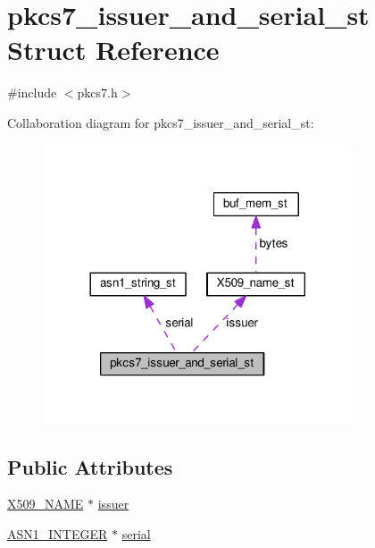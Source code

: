 \hypertarget{structpkcs7__issuer__and__serial__st}{}\section{pkcs7\+\_\+issuer\+\_\+and\+\_\+serial\+\_\+st Struct Reference}
\label{structpkcs7__issuer__and__serial__st}


{\ttfamily \#include $<$pkcs7.\+h$>$}



Collaboration diagram for pkcs7\+\_\+issuer\+\_\+and\+\_\+serial\+\_\+st\+:
\nopagebreak
\begin{figure}[H]
\begin{center}
\leavevmode
\includegraphics[width=260pt]{structpkcs7__issuer__and__serial__st__coll__graph}
\end{center}
\end{figure}
\subsection*{Public Attributes}
\begin{DoxyCompactItemize}
\item 
\hyperlink{ossl__typ_8h_a5c5fc036757e87b9bd163d0221696533}{X509\+\_\+\+N\+A\+ME} $\ast$ \hyperlink{structpkcs7__issuer__and__serial__st_ace9f7a526b2d91328ce37a1b3d26c179}{issuer}
\item 
\hyperlink{ossl__typ_8h_af4335399bf9774cb410a5e93de65998b}{A\+S\+N1\+\_\+\+I\+N\+T\+E\+G\+ER} $\ast$ \hyperlink{structpkcs7__issuer__and__serial__st_a46903221f3f9a3a0243bbaae23afbe98}{serial}
\end{DoxyCompactItemize}


